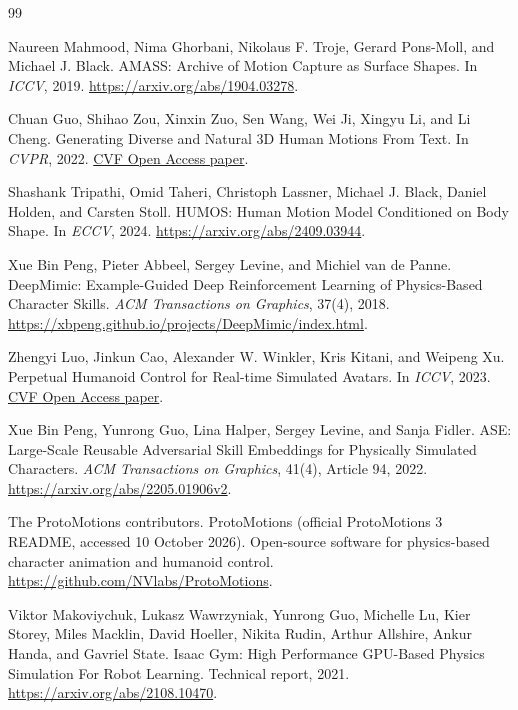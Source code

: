 \documentclass[11pt]{article}
\begin{document}
\begin{thebibliography}{99}

Naureen Mahmood, Nima Ghorbani, Nikolaus F. Troje, Gerard Pons-Moll,
and Michael J. Black.
AMASS: Archive of Motion Capture as Surface Shapes.
In \emph{ICCV}, 2019.
\url{https://arxiv.org/abs/1904.03278}.

Chuan Guo, Shihao Zou, Xinxin Zuo, Sen Wang, Wei Ji, Xingyu Li,
and Li Cheng.
Generating Diverse and Natural 3D Human Motions From Text.
In \emph{CVPR}, 2022.
\href{https://openaccess.thecvf.com/content/CVPR2022/html/Guo_Generating_Diverse_and_Natural_3D_Human_Motions_From_Text_CVPR_2022_paper.html}
{CVF Open Access paper}.

Shashank Tripathi, Omid Taheri, Christoph Lassner, Michael J. Black,
Daniel Holden, and Carsten Stoll.
HUMOS: Human Motion Model Conditioned on Body Shape.
In \emph{ECCV}, 2024.
\url{https://arxiv.org/abs/2409.03944}.

Xue Bin Peng, Pieter Abbeel, Sergey Levine, and Michiel van de Panne.
DeepMimic: Example-Guided Deep Reinforcement Learning of Physics-Based
Character Skills.
\emph{ACM Transactions on Graphics}, 37(4), 2018.
\url{https://xbpeng.github.io/projects/DeepMimic/index.html}.

Zhengyi Luo, Jinkun Cao, Alexander W. Winkler, Kris Kitani, and Weipeng Xu.
Perpetual Humanoid Control for Real-time Simulated Avatars.
In \emph{ICCV}, 2023.
\href{https://openaccess.thecvf.com/content/ICCV2023/html/Luo_Perpetual_Humanoid_Control_for_Real-time_Simulated_Avatars_ICCV_2023_paper.html}
{CVF Open Access paper}.

Xue Bin Peng, Yunrong Guo, Lina Halper, Sergey Levine, and Sanja Fidler.
ASE: Large-Scale Reusable Adversarial Skill Embeddings for Physically
Simulated Characters. \emph{ACM Transactions on Graphics}, 41(4), Article 94, 2022.
\url{https://arxiv.org/abs/2205.01906v2}.

The ProtoMotions contributors.
ProtoMotions (official ProtoMotions 3 README, accessed 10 October 2026).
Open-source software for physics-based character animation and humanoid control.
\url{https://github.com/NVlabs/ProtoMotions}.

Viktor Makoviychuk, Lukasz Wawrzyniak, Yunrong Guo, Michelle Lu, Kier Storey,
Miles Macklin, David Hoeller, Nikita Rudin, Arthur Allshire, Ankur Handa,
and Gavriel State.
Isaac Gym: High Performance GPU-Based Physics Simulation For Robot Learning.
Technical report, 2021.
\url{https://arxiv.org/abs/2108.10470}.


\end{thebibliography}
\end{document}
